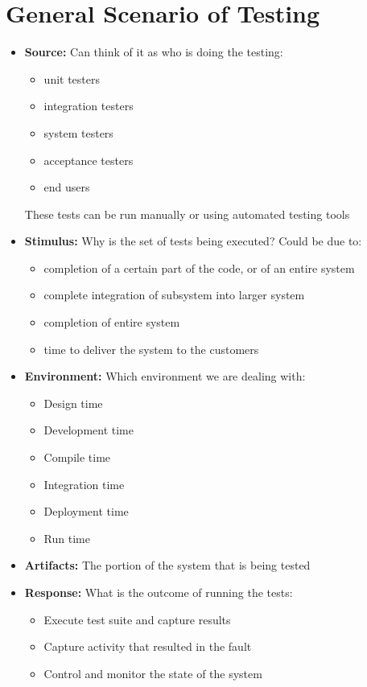 \documentclass[a4paper]{report}
\begin{document}
\section{General Scenario of Testing}
\begin{itemize}
\item   
   \textbf{Source:}
   Can think of it as who is doing the testing:
   \begin{itemize}
   \item unit testers
   \item integration testers
   \item system testers
   \item acceptance testers
   \item end users
   \end{itemize}
   These tests can be run manually or using automated testing tools
   
\item 
   \textbf{Stimulus:} 
   Why is the set of tests being executed? 
   Could be due to:
   \begin{itemize}
   \item completion of a certain part of the code, or of an entire system
   \item complete integration of subsystem into larger system
   \item completion of entire system
   \item time to deliver the system to the customers
   \end{itemize}
   
    
\item 
   \textbf{Environment:}
   Which environment we are dealing with:
   \begin{itemize}
   \item Design time
   \item Development time
   \item Compile time
   \item Integration time
   \item Deployment time
   \item Run time
   \end{itemize}  

\item
   \textbf{Artifacts:}
   The portion of the system that is being tested

\item 
   \textbf{Response:}
   What is the outcome of running the tests:
   \begin{itemize}
   \item Execute test suite and capture results
   \item Capture activity that resulted in the fault
   \item Control and monitor the state of the system
   \end{itemize} 


\end{itemize}
\end{document}
